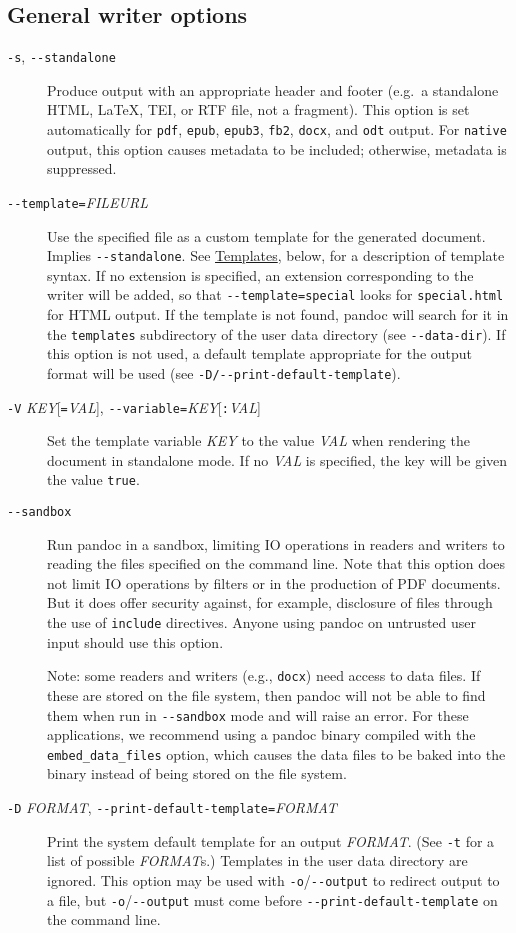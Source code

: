 \documentclass[
]{article}
\begin{document}
\subsection{General writer options}\label{general-writer-options}

\begin{description}
\item[\texttt{-s}, \texttt{-\/-standalone}]
Produce output with an appropriate header and footer (e.g.~a standalone
HTML, LaTeX, TEI, or RTF file, not a fragment). This option is set
automatically for \texttt{pdf}, \texttt{epub}, \texttt{epub3},
\texttt{fb2}, \texttt{docx}, and \texttt{odt} output. For
\texttt{native} output, this option causes metadata to be included;
otherwise, metadata is suppressed.
\item[\texttt{-\/-template=}\emph{FILE}\textbar{}\emph{URL}]
Use the specified file as a custom template for the generated document.
Implies \texttt{-\/-standalone}. See \hyperref[templates]{Templates},
below, for a description of template syntax. If no extension is
specified, an extension corresponding to the writer will be added, so
that \texttt{-\/-template=special} looks for \texttt{special.html} for
HTML output. If the template is not found, pandoc will search for it in
the \texttt{templates} subdirectory of the user data directory (see
\texttt{-\/-data-dir}). If this option is not used, a default template
appropriate for the output format will be used (see
\texttt{-D/-\/-print-default-template}).
\item[\texttt{-V} \emph{KEY}{[}\texttt{=}\emph{VAL}{]},
\texttt{-\/-variable=}\emph{KEY}{[}\texttt{:}\emph{VAL}{]}]
Set the template variable \emph{KEY} to the value \emph{VAL} when
rendering the document in standalone mode. If no \emph{VAL} is
specified, the key will be given the value \texttt{true}.
\item[\texttt{-\/-sandbox}]
Run pandoc in a sandbox, limiting IO operations in readers and writers
to reading the files specified on the command line. Note that this
option does not limit IO operations by filters or in the production of
PDF documents. But it does offer security against, for example,
disclosure of files through the use of \texttt{include} directives.
Anyone using pandoc on untrusted user input should use this option.

Note: some readers and writers (e.g., \texttt{docx}) need access to data
files. If these are stored on the file system, then pandoc will not be
able to find them when run in \texttt{-\/-sandbox} mode and will raise
an error. For these applications, we recommend using a pandoc binary
compiled with the \texttt{embed\_data\_files} option, which causes the
data files to be baked into the binary instead of being stored on the
file system.
\item[\texttt{-D} \emph{FORMAT},
\texttt{-\/-print-default-template=}\emph{FORMAT}]
Print the system default template for an output \emph{FORMAT}. (See
\texttt{-t} for a list of possible \emph{FORMAT}s.) Templates in the
user data directory are ignored. This option may be used with
\texttt{-o}/\texttt{-\/-output} to redirect output to a file, but
\texttt{-o}/\texttt{-\/-output} must come before
\texttt{-\/-print-default-template} on the command line.


\end{description}
\end{document}
